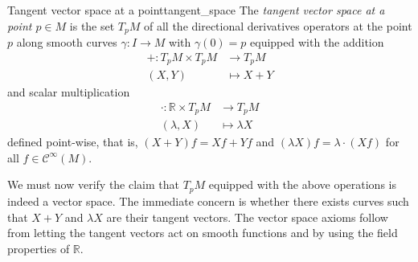 \begin{definition}{Tangent vector space at a point}{tangent_space}
    The \emph{tangent vector space at a point \(p \in M\)} is the set \(T_p M\) of all the directional derivatives operators at the point \(p\) along smooth curves \(\gamma : I \to M\) with \(\gamma(0) = p\) equipped with the addition
    \begin{align*}
        + : T_pM \times T_pM &\to T_pM\\
                    (X, Y)  &\mapsto X+Y
    \end{align*}
    and scalar multiplication
    \begin{align*}
        \cdot : \mathbb{R} \times T_pM &\to T_pM\\
                    (\lambda, X)  &\mapsto \lambda X
    \end{align*}
    defined point-wise, that is, \((X+Y)f = Xf + Yf\) and \((\lambda X)f = \lambda \cdot (Xf)\) for all \(f \in \mathcal{C}^\infty(M)\).
\end{definition}

We must now verify the claim that \(T_pM\) equipped with the above operations is indeed a vector space. The immediate concern is whether there exists curves such that \(X+Y\) and \(\lambda X\) are their tangent vectors. The vector space axioms follow from letting the tangent vectors act on smooth functions and by using the field properties of \(\mathbb{R}\).

